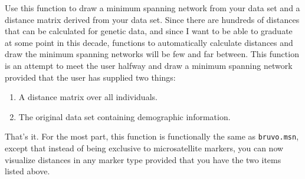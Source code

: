 \documentclass[letterpaper]{article}
\newcommand{\tab}{\hspace*{1em}}
\begin{document}
\tab\tab Use this function to draw a minimum spanning network from your data set and a distance matrix derived from your data set. Since there are hundreds of distances that can be calculated for genetic data, and since I want to be able to graduate at some point in this decade, functions to automatically calculate distances and draw the minimum spanning networks will be few and far between. This function is an attempt to meet the user halfway and draw a minimum spanning network provided that the user has supplied two things:
\begin{enumerate}
  \item A distance matrix over all individuals.
  \item The original data set containing demographic information.
\end{enumerate}

That's it. For the most part, this function is functionally the same as \texttt{bruvo.msn}, except that instead of being exclusive to microsatellite markers, you can now visualize distances in any marker type provided that you have the two items listed above.
\end{document}
